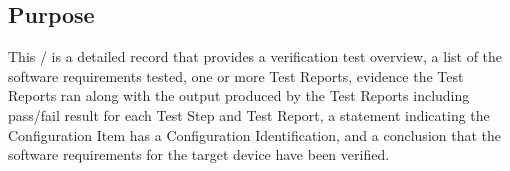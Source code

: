 \subsection{Purpose}
This \stdRptPkg/ is a detailed record that provides a verification test
overview, a list of the software requirements tested, one or more Test
Reports, evidence the Test Reports ran along with the output produced by
the Test Reports including pass/fail result for each Test Step and
Test Report, a statement indicating the Configuration Item has a
Configuration Identification, and a conclusion that the software requirements
for the target device have been verified.
